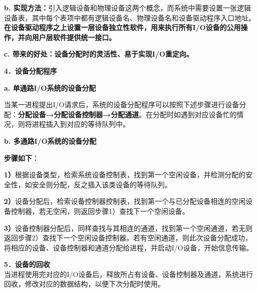 \textbf{b.
实现方法：}引入逻辑设备和物理设备这两个概念，而系统中需要设置一张逻辑设备表，其中每个表项中都有逻辑设备名、物理设备名和设备驱动程序入口地址。{\textbf{在设备驱动程序之上设置一层设备独立性软件，用来执行所有I/O设备的公用操作，并向用户层软件提供统一接口。}}

\textbf{c. 带来的好处：设备分配时的灵活性、易于实现I/O重定向。}

\textbf{{4．设备分配程序}}

\textbf{{a. 单通路I/O系统的设备分配}}

当某一进程提出I/O请求后，系统的设备分配程序可以按照下述步骤进行设备分配：\textbf{分配设备→分配设备控制器→分配通道}。在分配时如遇到对应设备忙的情况，则将进程插入到对应的等待队列中。

\textbf{{b. 多通路I/O系统的设备分配}}

\textbf{步骤如下}：

\textbf{1）}根据设备类型，检索系统设备控制表，找到第一个空闲设备，并检测分配的安全性，如安全则分配，反之插入该类设备的等待队列。

\textbf{2）}设备分配后，检索设备控制器控制表，找到第一个与已分配设备相连的空闲设备控制器，若无空闲，则返回步骤1）查找下一个空闲设备。

\textbf{3）}设备控制器分配后，同样查找与其相连的通道，找到第一个空闲通道，若无则返回步骤2）查找下一个空闲设备控制器。若有空闲通道，则此次设备分配成功，将相应的设备、设备控制器和通道分配给进程，并启动I/O设备，开始信息传输。

\textbf{{5．设备的回收}}\\
当进程使用完对应的I/O设备后，释放所占有设备、设备控制器及通道，系统进行回收，修改对应的数据结构，以便下次分配时使用。
